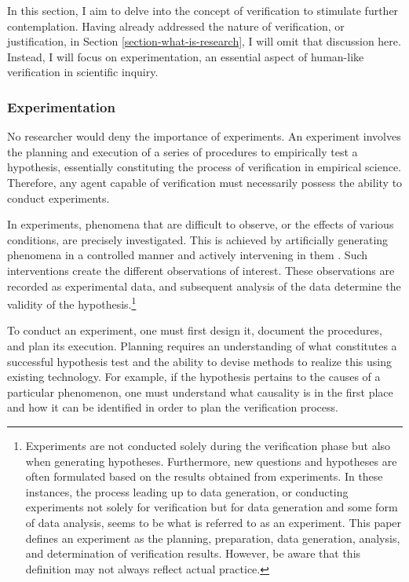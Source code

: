\documentclass{article}
\begin{document}
In this section, I aim to delve into the concept of verification to stimulate further contemplation. Having already addressed the nature of verification, or justification, in Section \ref{section-what-is-research}, I will omit that discussion here. Instead, I will focus on experimentation, an essential aspect of human-like verification in scientific inquiry.

\subsubsection{Experimentation}
\label{section-experimentation}
No researcher would deny the importance of experiments. An experiment involves the planning and execution of a series of procedures to empirically test a hypothesis, essentially constituting the process of verification in empirical science. Therefore, any agent capable of verification must necessarily possess the ability to conduct experiments.

In experiments, phenomena that are difficult to observe, or the effects of various conditions, are precisely investigated. This is achieved by artificially generating phenomena in a controlled manner and actively intervening in them \cite{radder2009philosophy}. Such interventions create the different observations of interest. These observations are recorded as experimental data, and subsequent analysis of the data determine the validity of the hypothesis.\footnote{
Experiments are not conducted solely during the verification phase but also when generating hypotheses. Furthermore, new questions and hypotheses are often formulated based on the results obtained from experiments. In these instances, the process leading up to data generation, or conducting experiments not solely for verification but for data generation and some form of data analysis, seems to be what is referred to as an experiment. This paper defines an experiment as the planning, preparation, data generation, analysis, and determination of verification results. However, be aware that this definition may not always reflect actual practice.
}

To conduct an experiment, one must first design it, document the procedures, and plan its execution. Planning requires an understanding of what constitutes a successful hypothesis test and the ability to devise methods to realize this using existing technology. For example, if the hypothesis pertains to the causes of a particular phenomenon, one must understand what causality is in the first place and how it can be identified in order to plan the verification process. 
\end{document}
